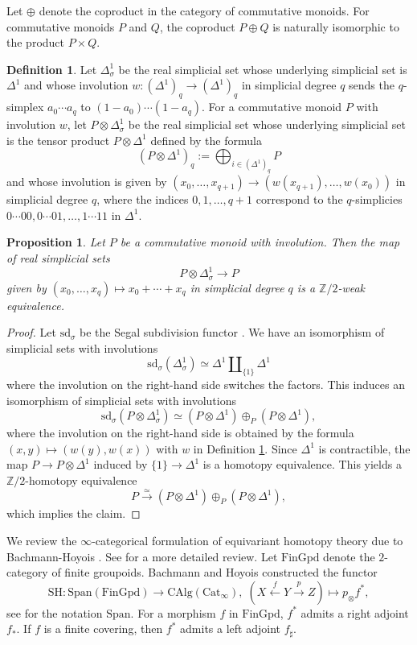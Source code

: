 \documentclass[10pt]{amsart}
\newtheorem{prop}[thm]{Proposition}
\theoremstyle{definition}
\newtheorem{df}[thm]{Definition}
\theoremstyle{remark}
\numberwithin{equation}{section}
\newcommand{\CAlg}{\mathrm{CAlg}}
\newcommand{\Span}{\mathrm{Span}}
\newcommand{\FinGpd}{\mathrm{FinGpd}}
\newcommand{\SH}{\mathrm{SH}}
\newcommand{\sd}{\mathrm{sd}}
\newcommand{\Ztwo}{{\mathbb{Z}/2}}
\newcommand{\Cat}{\mathrm{Cat}}
\begin{document}
Let $\oplus$ denote the coproduct in the category of commutative monoids.
For commutative monoids $P$ and $Q$,
the coproduct $P\oplus Q$ is naturally isomorphic to the product $P\times Q$.

\begin{df}
\label{drep.5}
Let $\Delta_\sigma^1$ be the real simplicial set whose underlying simplicial set is $\Delta^1$ and whose involution $w\colon (\Delta^1)_q\to (\Delta^1)_q$ in simplicial degree $q$ sends the $q$-simplex $a_0 \cdots a_q$ to $(1-a_0)\cdots (1-a_q)$.
For a commutative monoid $P$ with involution $w$,
let $P\otimes \Delta_\sigma^1$ be the real simplicial set whose underlying simplicial set is the tensor product $P\otimes \Delta^1$ defined by the formula
\[
(P\otimes \Delta^1)_q
:=
\bigoplus_{i\in (\Delta^1)_q}P
\]
and whose involution is given by $(x_0,\ldots,x_{q+1})\to (w(x_{q+1}),\ldots,w(x_0))$ in simplicial degree $q$,
where the indices $0,1,\ldots,q+1$ correspond to the $q$-simplicies $0\cdots 00,0\cdots 01,\ldots,1\cdots 11$ in $\Delta^1$.
\end{df}

\begin{prop}
\label{drep.1}
Let $P$ be a commutative monoid with involution.
Then the map of real simplicial sets
\[
P\otimes \Delta_\sigma^1
\to
P
\]
given by $(x_0,\ldots,x_q)\mapsto x_0+\cdots+x_q$ in simplicial degree $q$ is a $\Ztwo$-weak equivalence.
\end{prop}
\begin{proof}
Let $\sd_\sigma$ be the Segal subdivision functor \cite{Seg73}.
We have an isomorphism of simplicial sets with involutions
\[
\sd_\sigma(\Delta_\sigma^1)\simeq \Delta^1\amalg_{\{1\}} \Delta^1
\]
where the involution on the right-hand side switches the factors.
This induces an isomorphism of simplicial sets with involutions
\[
\sd_\sigma(P\otimes \Delta_\sigma^1)
\simeq
(P\otimes \Delta^1) \oplus_P (P\otimes \Delta^1),
\]
where the involution on the right-hand side is obtained by the formula $(x,y)\mapsto (w(y),w(x))$ with $w$ in Definition \ref{drep.5}.
Since $\Delta^1$ is contractible,
the map $P\to P\otimes \Delta^1$ induced by $\{1\}\to \Delta^1$ is a homotopy equivalence.
This yields a $\Ztwo$-homotopy equivalence
\[
P
\xrightarrow{\simeq}
(P\otimes \Delta^1) \oplus_P (P\otimes \Delta^1),
\]
which implies the claim.
\end{proof}






We review the $\infty$-categorical formulation of equivariant homotopy theory due to Bachmann-Hoyois \cite[\S 9]{BH21}.
See \cite[\S A.1]{THR} for a more detailed review.
Let $\FinGpd$ denote the $2$-category of finite groupoids.
Bachmann and Hoyois constructed the functor
\[
\SH
\colon
\Span(\FinGpd)
\to
\CAlg(\Cat_\infty),
\;
(X\xleftarrow{f} Y\xrightarrow{p} Z)
\mapsto
p_\otimes f^*,
\]
see \cite[\S C]{BH21} for the notation $\Span$.
For a morphism $f$ in $\FinGpd$,
$f^*$ admits a right adjoint $f_*$.
If $f$ is a finite covering,
then $f^*$ admits a left adjoint $f_\sharp$.
\end{document}
